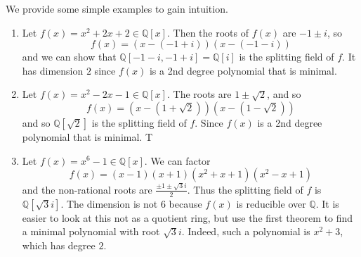   \begin{example}
    We provide some simple examples to gain intuition. 
    \begin{enumerate}
      \item Let $f(x) = x^2 + 2x + 2 \in \mathbb{Q}[x]$. Then the roots of $f(x)$ are $-1 \pm i$, so 
      \begin{equation}
        f(x) = (x - (-1 + i)) (x - (-1 - i)) 
      \end{equation}
      and we can show that $\mathbb{Q}[-1 - i, -1+i] = \mathbb{Q}[i]$ is the splitting field of $f$. It has dimension $2$ since $f(x)$ is a 2nd degree polynomial that is minimal. 

      \item Let $f(x) = x^2 - 2x - 1 \in \mathbb{Q}[x]$. The roots are $1 \pm \sqrt{2}$, and so 
      \begin{equation}
        f(x) = (x - (1 + \sqrt{2})) (x - (1 - \sqrt{2}))
      \end{equation}
      and so $\mathbb{Q}[\sqrt{2}]$ is the splitting field of $f$. Since $f(x)$ is a 2nd degree polynomial that is minimal. T

      \item Let $f(x) = x^6 - 1 \in \mathbb{Q}[x]$. We can factor 
      \begin{equation}
        f(x) = (x-1) (x + 1) (x^2 + x + 1) (x^2 - x + 1)
      \end{equation} 
      and the non-rational roots are $\frac{\pm 1 \pm \sqrt{3} i}{2}$. Thus the splitting field of $f$ is $\mathbb{Q}[\sqrt{3} i]$. The dimension is not 6 because $f(x)$ is reducible over $\mathbb{Q}$. It is easier to look at this not as a quotient ring, but use the first theorem to find a minimal polynomial with root $\sqrt{3} i$. Indeed, such a polynomial is $x^2 + 3$, which has degree $2$. 
    \end{enumerate}
  \end{example}

